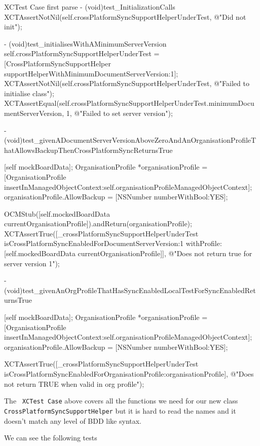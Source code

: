 \documentclass[a4paper, titlepage]{article}
\begin{document}
  \begin{listbox}{1}{XCTest Case first parse}
      - (void)test_InitializationCalls
      {
          XCTAssertNotNil(self.crossPlatformSyncSupportHelperUnderTest, @"Did not init");
      }

      - (void)test_initialisesWithAMinimumServerVersion
      {
          self.crossPlatformSyncSupportHelperUnderTest = [CrossPlatformSyncSupportHelper supportHelperWithMinimumDocumentServerVersion:1];
          XCTAssertNotNil(self.crossPlatformSyncSupportHelperUnderTest, @"Failed to initialise class");
          XCTAssertEqual(self.crossPlatformSyncSupportHelperUnderTest.minimumDocumentServerVersion, 1, @"Failed to set server version");
      }

      - (void)test_givenADocumentServerVersionAboveZeroAndAnOrganisationProfileThatAllowsBackupThenCrossPlatformSyncReturnsTrue
      {
          [self mockBoardData];
          OrganisationProfile *organisationProfile = [OrganisationProfile insertInManagedObjectContext:self.organisationProfileManagedObjectContext];
          organisationProfile.AllowBackup = [NSNumber numberWithBool:YES];

          OCMStub([self.mockedBoardData currentOrganisationProfile]).andReturn(organisationProfile);
          XCTAssertTrue([_crossPlatformSyncSupportHelperUnderTest
          isCrossPlatformSyncEnabledForDocumentServerVersion:1
          withProfile: [self.mockedBoardData currentOrganisationProfile]], @"Does not return true for server version 1");
      }

      - (void)test_givenAnOrgProfileThatHasSyncEnabledLocalTestForSyncEnabledReturnsTrue
      {
          [self mockBoardData];
          OrganisationProfile *organisationProfile = [OrganisationProfile insertInManagedObjectContext:self.organisationProfileManagedObjectContext];
          organisationProfile.AllowBackup = [NSNumber numberWithBool:YES];

          XCTAssertTrue([_crossPlatformSyncSupportHelperUnderTest isCrossPlatformSyncEnabledForOrganisationProfile:organisationProfile], @"Does not return TRUE when valid in org profile");
      }
  \end{listbox}

  The \texttt{ XCTest Case} above covers all the functions we
  need for our new class 
  \texttt{CrossPlatformSyncSupportHelper}
  but it is hard to read the names and it doesn't match any level of BDD like syntax.
  
  We can see the following tests
\end{document}

